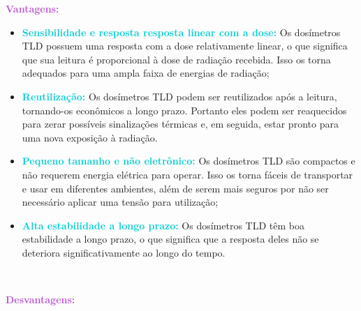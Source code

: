 \documentclass[11pt,a4paper]{article}
\begin{document}
		\begin{tcolorbox}[width=\textwidth, colback={white}, colbacktitle={DarkTurquoise!50!white}, title={$\bigstar$ \LobsterTwo{TLD} $\bigstar$}, coltitle={CarnationPink}, colframe={DarkTurquoise}, fonttitle=\rmfamily\bfseries\Large, breakable]

		\textcolor{MediumOrchid}{\Large\LobsterTwo\textbf{Vantagens:}}
		\begin{itemize}[label=\textcolor{CarnationPink}{$\blacktriangleright$}]
			\item \textcolor{DarkTurquoise}{\textbf{Sensibilidade e resposta resposta linear com a dose:}} Os dosímetros TLD possuem uma resposta com a dose relativamente linear, o que significa que sua leitura é proporcional à dose de radiação recebida. Isso os torna adequados para uma ampla faixa de energias de radiação;
			\item \textcolor{DarkTurquoise}{\textbf{Reutilização:}} Os dosímetros TLD podem ser reutilizados após a leitura, tornando-os econômicos a longo prazo. Portanto eles podem ser reaquecidos para zerar possíveis sinalizações térmicas e, em seguida, estar pronto para uma nova exposição à radiação.
			\item \textcolor{DarkTurquoise}{\textbf{Pequeno tamanho e não eletrônico:}} Os dosímetros TLD são compactos e não requerem energia elétrica para operar. Isso os torna fáceis de transportar e usar em diferentes ambientes, além de serem mais seguros por não ser necessário aplicar uma tensão para utilização;
			\item \textcolor{DarkTurquoise}{\textbf{Alta estabilidade a longo prazo:}} Os dosímetros TLD têm boa estabilidade a longo prazo, o que significa que a resposta deles não se deteriora significativamente ao longo do tempo.
		\end{itemize}

		\

		\textcolor{MediumOrchid}{\Large\LobsterTwo\textbf{Desvantagens:}}
		

\end{tcolorbox}
\end{document}
